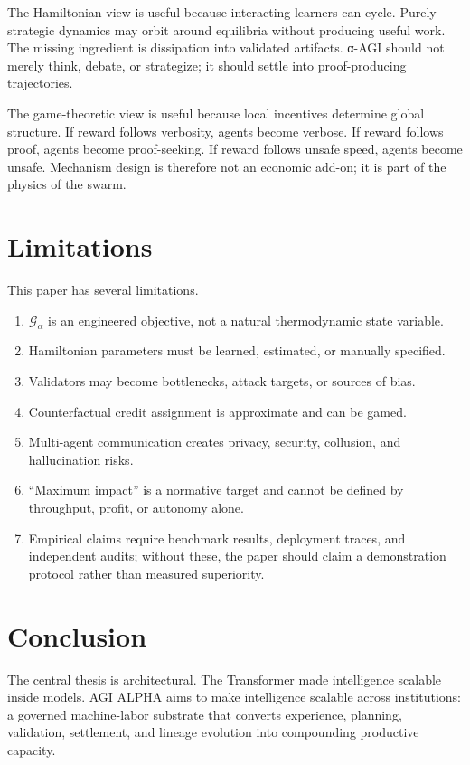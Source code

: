 \documentclass[11pt]{article}
\providecommand{\tightlist}{\setlength{\itemsep}{0pt}\setlength{\parskip}{0pt}}
\begin{document}
The Hamiltonian view is useful because interacting learners can cycle. Purely strategic dynamics may orbit around equilibria without producing useful work. The missing ingredient is dissipation into validated artifacts. α-AGI should not merely think, debate, or strategize; it should settle into proof-producing trajectories.

The game-theoretic view is useful because local incentives determine global structure. If reward follows verbosity, agents become verbose. If reward follows proof, agents become proof-seeking. If reward follows unsafe speed, agents become unsafe. Mechanism design is therefore not an economic add-on; it is part of the physics of the swarm.

\section{Limitations}\label{limitations}

This paper has several limitations.

\begin{enumerate}
\def\labelenumi{\arabic{enumi}.}
\tightlist
\item
  \(\mathcal{G}_{\alpha}\) is an engineered objective, not a natural thermodynamic state variable.
\item
  Hamiltonian parameters must be learned, estimated, or manually specified.
\item
  Validators may become bottlenecks, attack targets, or sources of bias.
\item
  Counterfactual credit assignment is approximate and can be gamed.
\item
  Multi-agent communication creates privacy, security, collusion, and hallucination risks.
\item
  ``Maximum impact'' is a normative target and cannot be defined by throughput, profit, or autonomy alone.
\item
  Empirical claims require benchmark results, deployment traces, and independent audits; without these, the paper should claim a demonstration protocol rather than measured superiority.
\end{enumerate}

\section{Conclusion}\label{conclusion}

The central thesis is architectural. The Transformer made intelligence scalable inside models. AGI ALPHA aims to make intelligence scalable across institutions: a governed machine-labor substrate that converts experience, planning, validation, settlement, and lineage evolution into compounding productive capacity.
\end{document}
